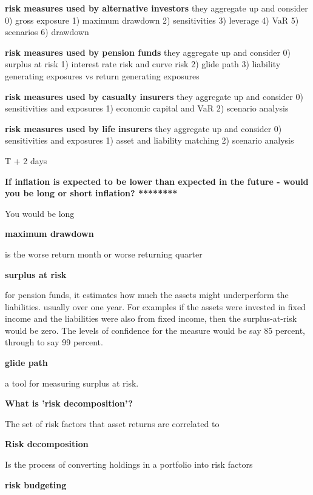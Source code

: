 \documentclass[12pt]{article}
\begin{document}
{\begin{framed}
		\textbf{risk measures used by alternative investors}
		they aggregate up and consider
	0) gross exposure
	1) maximum drawdown 
	2) sensitivities
	3) leverage
	4) VaR
	5) scenarios
	6) drawdown
	
			\textbf{risk measures used by pension funds}
	they aggregate up and consider
	0) surplus at risk
	1) interest rate risk and curve risk
	2) glide path
	3) liability generating exposures vs return generating exposures
	
	
	\textbf{risk measures used by casualty insurers }
	they aggregate up and consider
	0) sensitivities and exposures
	1) economic capital and VaR
	2) scenario analysis
	
	\textbf{risk measures used by life insurers }
	they aggregate up and consider
	0) sensitivities and exposures
	1) asset and liability matching
	2) scenario analysis
	
\end{framed}


T + 2 days


\textbf{If inflation is expected to be lower than expected in the future - would you be long or short inflation?   ********}

You would be long


\textbf{maximum drawdown}

is the worse return month or worse returning quarter

\textbf{surplus at risk}

for pension funds, it estimates how much the assets might underperform the liabilities. usually over one year. For examples if the assets were invested in fixed income and the liabilities were also from fixed income, then the surplus-at-risk would be zero.  The levels of confidence for the measure would be say 85 percent, through to say 99 percent. 

\textbf{glide path}

a tool for measuring surplus at risk.

\textbf{What is 'risk decomposition'?}

The set of risk factors that asset returns are correlated to

\textbf{Risk decomposition}

Is the process of converting holdings in a portfolio into risk factors

\textbf{risk budgeting}

}
\end{document}

